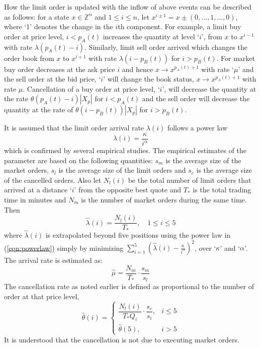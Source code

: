 How the limit order is updated with the inflow of above events can be described as follows: for a state $x \in \mathbb{Z}^n$ and $1 \leq i \leq n$, let $x^{i \pm 1}=x \pm (0,\ldots,1,\ldots,0)$, where `1' denotes the change in the $i$th component. For example, a limit buy order at price level, $i<p_A(t)$ increases the quantity at level `$i$', from $x$ to $x^{i-1}$ with rate $\lambda(p_A(t)-i)$. Similarly, limit sell order arrived which changes the order book from $x$ to $x^{i+1}$ with rate $\lambda(i-p_B(t))$ for $i>p_B(t)$. For market buy order decreases at the ask price $i$ and hence $x \to x^{p_A(t)+1}$ with rate `$\mu$' and the sell order at the bid price, `$i$' will change the book status, $x \to x^{p_A(t)+1}$ with rate $\mu$. Cancellation of a buy order at price level, `$i$', will decrease the quantity at the rate $\theta(p_A(t)-i)|X_p|$ for $i<p_A(t)$ and the sell order will decrease the quantity at the rate of $\theta(i-p_B(t))|X_p|$ for $i>p_B(t)$.


It is assumed that the limit order arrival rate $\lambda(i)$ follows a power law
	\begin{equation}\label{eqn:powerlaw}
	\lambda(i)=\dfrac{\kappa}{i^\alpha}
	\end{equation}
which is confirmed by several empirical studies. The empirical estimates of the parameter are based on the following quantities: $s_m$ is the average size of the market orders, $s_l$ is the average size of the limit orders and $s_c$ is the average size of the cancelled orders. Also let $N_l(i)$ be the total number of limit orders that arrived at a distance `$i$' from the opposite best quote and $T_*$ is the total trading time in minutes and $N_m$ is the number of market orders during the same time. Then 
	\begin{equation}\label{eqn:hatlambdant}
	\hat{\lambda}(i)= \dfrac{N_l(i)}{T_*}, \quad 1 \leq i \leq 5
	\end{equation}
where $\hat{\lambda}(i)$ is extrapolated beyond five positions using the power law in (\ref{eqn:powerlaw}) simply by minimizing $\sum_{i=1}^5 (\hat{\lambda}(i)- \frac{\kappa}{i^\alpha})^2$, over `$\kappa$' and `$\alpha$'. The arrival rate is estimated as:
	\begin{equation}\label{eqn:hatnmt}
	\hat{\mu}=\dfrac{N_m}{T_*} \cdot \dfrac{s_m}{s_l}
	\end{equation}
The cancellation rate as noted earlier is defined as proportional to the number of order at that price level,
	\begin{equation}\label{eqn:hatthetacase}
	\hat{\theta}(i)=
	\begin{cases}
	\dfrac{N_l(i)}{T_*Q_i} \cdot \dfrac{s_c}{s_i}, & i \leq 5 \\
	\hat{\theta}(5), & i>5
	\end{cases}
	\end{equation}
It is understood that the cancellation is not due to executing market orders.


